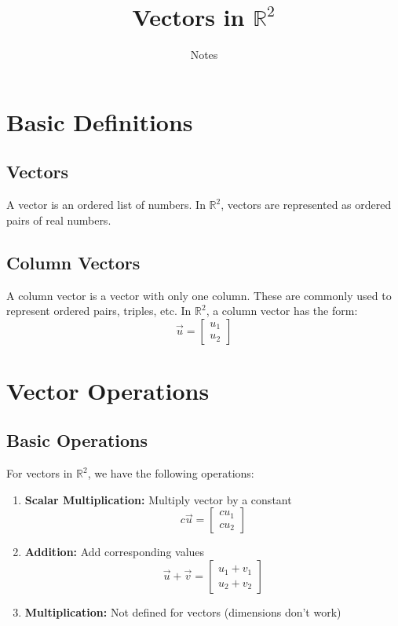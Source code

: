 \documentclass{article}
\title{Vectors in $\mathbb{R}^2$}
\author{Notes}
\date{}
\begin{document}
\maketitle

\section{Basic Definitions}

\subsection{Vectors}
A vector is an ordered list of numbers. In $\mathbb{R}^2$, vectors are represented as ordered pairs of real numbers.

\subsection{Column Vectors}
A column vector is a vector with only one column. These are commonly used to represent ordered pairs, triples, etc. In $\mathbb{R}^2$, a column vector has the form:
\[
\vec{u} = \begin{bmatrix} u_1 \\ u_2 \end{bmatrix}
\]

\section{Vector Operations}

\subsection{Basic Operations}
For vectors in $\mathbb{R}^2$, we have the following operations:

\begin{enumerate}
    \item \textbf{Scalar Multiplication:} Multiply vector by a constant
    \[
    c\vec{u} = \begin{bmatrix} cu_1 \\ cu_2 \end{bmatrix}
    \]
    
    \item \textbf{Addition:} Add corresponding values
    \[
    \vec{u} + \vec{v} = \begin{bmatrix} u_1 + v_1 \\ u_2 + v_2 \end{bmatrix}
    \]
    
    \item \textbf{Multiplication:} Not defined for vectors (dimensions don't work)
\end{enumerate}
\end{document}
